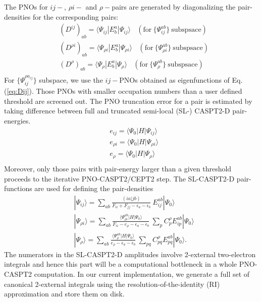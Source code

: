 \documentclass[aip,jcp,amsmath]{revtex4-1}
\begin{document}
%
The PNOs for $ij-$, $\rho i-$ and $\rho-$pairs are generated by diagonalizing the pair-densities for the corresponding pairs:
%
\begin{align}
  &(D^{ij})_{ab}    =\langle\Psi_{ij}    |E^a_b|\Psi_{ij}    \rangle \ \ \ \ (\text{for}\ \{\Psi_{ij}^{ab}\}\ \text{subspsace}) \label{eq:Dij}\\
  &(D^{\rho i})_{ab}=\langle\Psi_{\rho i}|E^a_b|\Psi_{\rho i}\rangle \ \ \ \ (\text{for}\ \{\Psi_{\rho i}^{ab}\}\ \text{subspsace})\\
  &(D^{\rho})_{ab}  =\langle\Psi_{\rho}  |E^a_b|\Psi_{\rho}  \rangle \ \ \ \ (\text{for}\ \{\Psi_{\rho}^{ab}\}\ \text{subspsace})\\  
\end{align}
%
For $\{\Psi_{ij}^{\rho a_{ij}}\}$ subspace, we use the $ij-$PNOs obtained as eigenfunctions of Eq. (\ref{eq:Dij}).
%
Those PNOs with smaller occupation numbers than a user defined threshold are screened out.
%
The PNO truncation error for a pair is estimated by taking difference between full and truncated semi-local (SL-) CASPT2-D pair-energies.
%
\begin{align}
  &e_{ij}=\langle\Psi_0|H|\Psi_{ij}\rangle \\
  &e_{\rho i}=\langle\Psi_0|H|\Psi_{\rho i}\rangle \\
  &e_{\rho}=\langle\Psi_0|H|\Psi_{\rho}\rangle \\  
\end{align}
%
Moreover, only those pairs with pair-energy larger than a given threshold proceeds to the iterative PNO-CASPT2/CEPT2 step.
%
The SL-CASPT2-D pair-functions are used for defining the pair-densities
%
\begin{align}
  &|\Psi_{ij}\rangle=\sum_{ab}\frac{(ia|jb)}{F_{ii}+F_{jj}-\epsilon_a-\epsilon_b}\ E_{ij}^{ab}|\Psi_0\rangle \\
  &|\Psi_{\rho i}\rangle=\sum_{ab}\frac{\langle\Psi_{\rho i}^{ab}|H|\Psi_0\rangle}{F_{ii}-e_\rho-\epsilon_a-\epsilon_b}\ \sum_{p} C_p^\rho E_{ip}^{ab}|\Psi_0\rangle \\
  &|\Psi_{\rho}\rangle=\sum_{ab}\frac{\langle\Psi_{\rho}^{ab}|H|\Psi_0\rangle}{e_\rho-\epsilon_a-\epsilon_b}\ \sum_{pq} C_{pq}^\rho E_{pq}^{ab}|\Psi_0\rangle.
\end{align}
%
The numerators in the SL-CASPT2-D amplitudes involve 2-external two-electron integrals and hence this part will be a computational bottleneck in a whole PNO-CASPT2 computation.
%
In our current implementation, we generate a full set of canonical 2-external integrals using the resolution-of-the-identity (RI) approximation and store them on disk.
\end{document}
